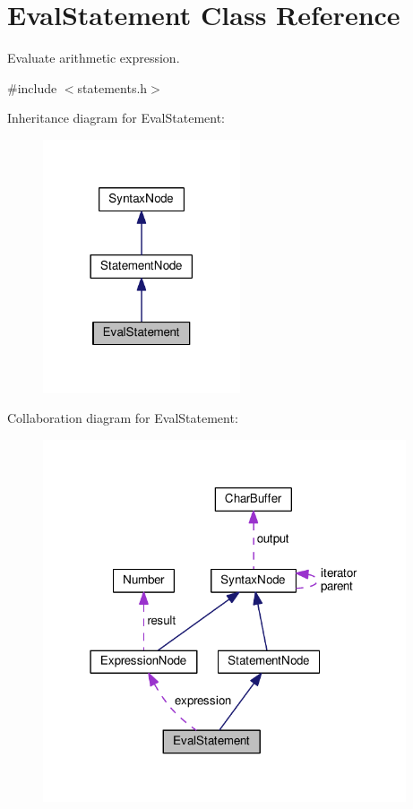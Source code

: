 \hypertarget{classEvalStatement}{}\section{Eval\+Statement Class Reference}
\label{classEvalStatement}


Evaluate arithmetic expression.  




{\ttfamily \#include $<$statements.\+h$>$}



Inheritance diagram for Eval\+Statement\+:\nopagebreak
\begin{figure}[H]
\begin{center}
\leavevmode
\includegraphics[width=165pt]{classEvalStatement__inherit__graph}
\end{center}
\end{figure}


Collaboration diagram for Eval\+Statement\+:\nopagebreak
\begin{figure}[H]
\begin{center}
\leavevmode
\includegraphics[width=304pt]{classEvalStatement__coll__graph}
\end{center}
\end{figure}
